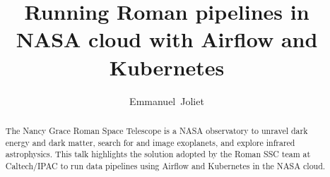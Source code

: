 \documentclass[11pt,twoside]{article}
\begin{document}
\title{Running Roman pipelines in NASA cloud with Airflow and Kubernetes}

\author{Emmanuel~Joliet}




\begin{abstract}
The Nancy Grace Roman Space Telescope is a NASA observatory to unravel dark energy and dark matter, search for and image exoplanets, and explore infrared astrophysics. This talk highlights the solution adopted by the Roman SSC team at Caltech/IPAC to run data pipelines using Airflow and Kubernetes in the NASA cloud.
\end{abstract}

\end{document}
